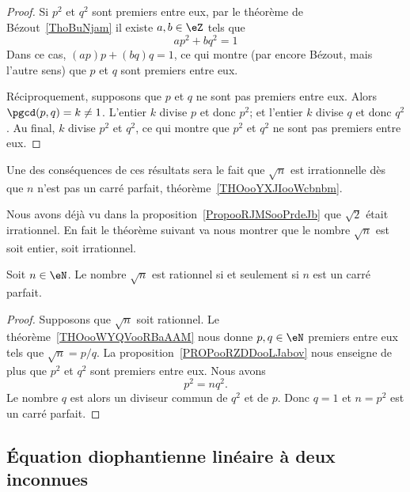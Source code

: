 \begin{proof}
	Si \( p^2\) et \( q^2\) sont premiers entre eux, par le théorème de Bézout~\ref{ThoBuNjam} il existe \( a,b\in \eZ\) tels que
	\begin{equation}
		ap^2+bq^2=1
	\end{equation}
	Dans ce cas, \( (ap)p+(bq)q=1\), ce qui montre (par encore Bézout, mais l'autre sens) que \( p\) et \( q\) sont premiers entre eux.

	Réciproquement, supposons que \( p\) et \( q\) ne sont pas premiers entre eux. Alors \( \pgcd(p,q)=k\neq 1\). L'entier \( k\) divise \( p\) et donc \( p^2\); et l'entier \( k\) divise \( q\) et donc \( q^2\). Au final, \( k\) divise \( p^2\) et \( q^2\), ce qui montre que \( p^2\) et \( q^2\) ne sont pas premiers entre eux.
\end{proof}

Une des conséquences de ces résultats sera le fait que \( \sqrt{n}\) est irrationnelle dès que \( n\) n'est pas un carré parfait, théorème~\ref{THOooYXJIooWcbnbm}.

Nous avons déjà vu dans la proposition~\ref{PropooRJMSooPrdeJb} que \( \sqrt{2}\) était irrationnel. En fait le théorème suivant va nous montrer que le nombre \( \sqrt{ n }\) est soit entier, soit irrationnel.
\begin{theorem}     \label{THOooYXJIooWcbnbm}
	Soit \( n\in \eN\). Le nombre \( \sqrt{n}\) est rationnel si et seulement si \( n\) est un carré parfait.
\end{theorem}

\begin{proof}
	Supposons que \( \sqrt{n}\) soit rationnel. Le théorème~\ref{THOooWYQVooRBaAAM} nous donne \( p,q\in \eN\) premiers entre eux tels que \( \sqrt{n}=p/q\). La proposition~\ref{PROPooRZDDooLJabov} nous enseigne de plus que \( p^2\) et \( q^2\) sont premiers entre eux. Nous avons
	\begin{equation}
		p^2=nq^2.
	\end{equation}
	Le nombre \( q\) est alors un diviseur commun de \( q^2\) et de \( p\). Donc \( q=1\) et \( n=p^2\) est un carré parfait.
\end{proof}

\subsection{Équation diophantienne linéaire à deux inconnues}
\label{subsecZVKNooXNjPSf}

